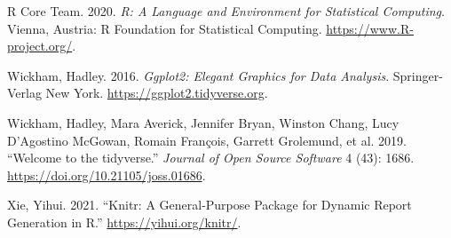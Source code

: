 \documentclass[
]{article}
\begin{document}
\leavevmode\hypertarget{ref-citeR}{}%
R Core Team. 2020. \emph{R: A Language and Environment for Statistical Computing}. Vienna, Austria: R Foundation for Statistical Computing. \url{https://www.R-project.org/}.

\leavevmode\hypertarget{ref-gg}{}%
Wickham, Hadley. 2016. \emph{Ggplot2: Elegant Graphics for Data Analysis}. Springer-Verlag New York. \url{https://ggplot2.tidyverse.org}.

\leavevmode\hypertarget{ref-tidy}{}%
Wickham, Hadley, Mara Averick, Jennifer Bryan, Winston Chang, Lucy D'Agostino McGowan, Romain François, Garrett Grolemund, et al. 2019. ``Welcome to the tidyverse.'' \emph{Journal of Open Source Software} 4 (43): 1686. \url{https://doi.org/10.21105/joss.01686}.

\leavevmode\hypertarget{ref-knitr}{}%
Xie, Yihui. 2021. ``Knitr: A General-Purpose Package for Dynamic Report Generation in R.'' \url{https://yihui.org/knitr/}.
\end{document}
